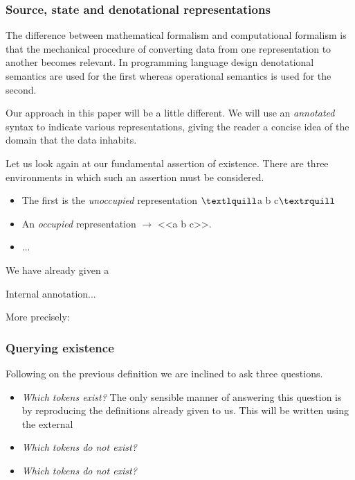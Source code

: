 \documentclass[11pt]{article}
\begin{document}

\subsubsection{Source, state and denotational representations}
The difference between mathematical formalism and computational formalism is that the mechanical procedure of converting data from one representation to another becomes relevant.
In programming language design denotational semantics are used for the first whereas operational semantics is used for the second.

Our approach in this paper will be a little different. We will use an \emph{annotated} syntax to indicate various representations, giving the reader a concise idea of the domain that the data inhabits.

Let us look again at our fundamental assertion of existence. There are three environments in which such an assertion must be considered.
\begin{itemize}
\item The first is the \emph{unoccupied} representation $\textlquill$a b c$\textrquill$
\item An \emph{occupied} representation $\rightarrow$ <<a b c>>.
\item ... 
\end{itemize}
We have already given a 

Internal annotation...

More precisely:



\subsubsection{Querying existence}
Following on the previous definition we are inclined to ask three questions.

\begin{itemize}
\item \emph{Which tokens exist?} The only sensible manner of answering this question is by reproducing the definitions already given to us. 
This will be written using the external 
\item \emph{Which tokens do not exist?}
\item \emph{Which tokens do not exist?}
\end{itemize}
\end{document}
